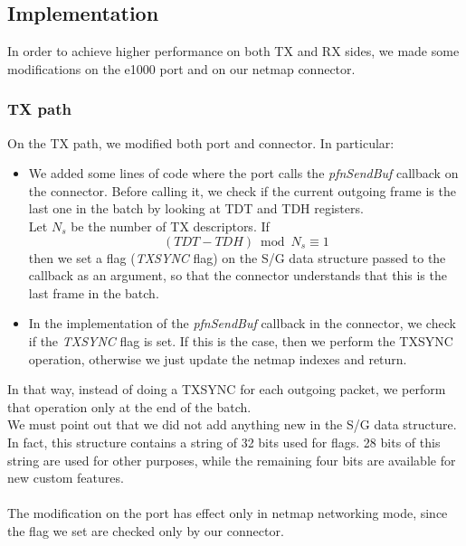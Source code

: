 \documentclass[a4paper, 12pt, titlepage]{report}
\begin{document}
\subsection{Implementation}
In order to achieve higher performance on both TX and RX sides, we made some  modifications on the e1000 port and on our netmap connector.

\subsubsection{TX path}
On the TX path, we modified both port and connector. In particular:
\begin{itemize}
\item We added some lines of code where the port calls the \textit{pfnSendBuf} callback on the connector. Before calling it, we check if the current outgoing frame is the last one in the batch by looking at TDT and TDH registers. 
\\
Let $N_s$ be the number of TX descriptors. If $$(TDT - TDH) \bmod N_s \equiv 1$$ then we set a flag (\textit{TXSYNC} flag) on the S/G data structure passed to the callback as an argument, so that the connector understands that this is the last frame in the batch.
\item In the implementation of the \textit{pfnSendBuf} callback in the connector, we check if the \textit{TXSYNC} flag is set. If this is the case, then we perform the TXSYNC operation, otherwise we just update the netmap indexes and return.
\end{itemize}
In that way, instead of doing a TXSYNC for each outgoing packet, we perform that operation only at the end of the batch.
\\
We must point out that we did not add anything new in the S/G data structure. In fact, this structure contains a string of 32 bits used for flags. 28 bits of this string are used for other purposes, while the remaining four bits are  available for new custom features.
\\
\\
The modification on the port has effect only in netmap networking mode, since the flag we set are checked only by our connector.
\end{document}
